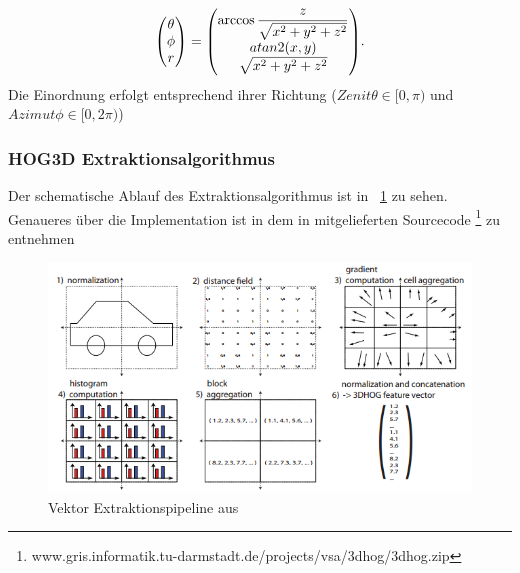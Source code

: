 \begin{equation}
\label{Sphere_Koord}
\begin{pmatrix}
	\theta \\ 
	 \phi \\ 
	 r
\end{pmatrix}
= \begin{pmatrix}
	\arccos\dfrac{z}{\sqrt{x^2+y^2+z^2}} \\ 
	 atan2(x,y) \\ 
	 \sqrt{x^2+y^2+z^2}
\end{pmatrix}
$$.
\end{equation}
Die Einordnung erfolgt entsprechend ihrer Richtung ($Zenit \theta \in [0,\pi) $ und $Azimut \phi \in [0,2\pi)$)  

\subsubsection{HOG3D Extraktionsalgorithmus }
Der schematische Ablauf des Extraktionsalgorithmus ist in \figurename~\ref{Vekt_ext_pipe} zu sehen. Genaueres über die Implementation ist in dem in \cite{scherer2010histograms} mitgelieferten Sourcecode \footnote{www.gris.informatik.tu-darmstadt.de/projects/vsa/3dhog/3dhog.zip} zu entnehmen 

 \begin{figure}[thpb]
 	\centering
 	\includegraphics[width=\linewidth]{2-Hauptteil/pics/HOG3D_extrac_pipe.png}
 	
 	\caption{Vektor Extraktionspipeline aus \cite{scherer2010histograms}}
 	\label{Vekt_ext_pipe}
 \end{figure}

